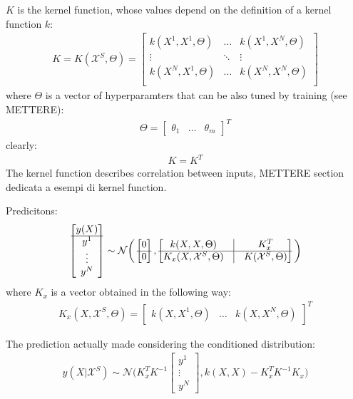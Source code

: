 \documentclass{article}
\begin{document}
$K$ is the kernel function, whose values depend on the definition of a kernel function $k$:
\begin{eqnarray}
K = K(\mathcal{X}^S, \Theta) = \begin{bmatrix}
k(X^1, X^1, \Theta) & \hdots & k(X^1, X^N, \Theta) \\ 
\vdots & \ddots & \vdots \\ 
k(X^N, X^1, \Theta) & \hdots & k(X^N, X^N, \Theta) \\ 
\end{bmatrix}
\end{eqnarray}
where $\Theta$ is a vector of hyperparamters that can be also tuned by training (see METTERE):
\begin{eqnarray}
\Theta = \begin{bmatrix} \theta_1 & \hdots & \theta_m \end{bmatrix} ^ T
\end{eqnarray}
clearly:
\begin{eqnarray}
K = K^T
\end{eqnarray}
The kernel function describes correlation between inputs, METTERE section dedicata a esempi di kernel function.

Predicitons:
\begin{eqnarray}
\begin{bmatrix} y(X) \\ \hline y^1 \\ \vdots \\ y^N \end{bmatrix} \sim \mathcal{N} 
\bigg (
\begin{bmatrix} 0 \\ \hline 0 \end{bmatrix},
\begin{bmatrix}
k(X,X, \Theta) & \vline & K_x^T \\ 
\hline
K_x(X, \mathcal{X}^S, \Theta) & \vline & K(\mathcal{X}^S, \Theta)
\end{bmatrix}
\bigg )
\end{eqnarray}
where $K_x$ is a vector obtained in the following way:
\begin{eqnarray}
K_x(X, \mathcal{X}^S, \Theta) = \begin{bmatrix}
k(X, X^1 , \Theta) & \hdots & k(X, X^N , \Theta)
\end{bmatrix} ^ T
\end{eqnarray}

The prediction actually made considering the conditioned distribution:
\begin{eqnarray}
y(X | \mathcal{X}^S) \sim \mathcal{N} \bigg ( 
K_x^T K^{-1} \begin{bmatrix} y^1 \\ \vdots \\ y^N \end{bmatrix} , 
k(X,X) - K_x^T K^{-1}K_x
\bigg )
\end{eqnarray}
\end{document}
